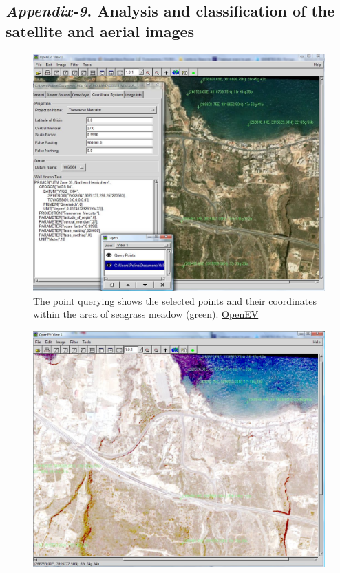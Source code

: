 \documentclass[10pt, a4paper]{article}
\begin{document}
\begin{appendices}
\subsection{\textit{Appendix-9}. Analysis and classification of the satellite and aerial images}

\begin{figure}[H]
	\begin{center}
		\includegraphics[scale=0.23]{OpenEV-2.jpg}
		\caption{The point querying shows the selected points and their coordinates within the area of seagrass meadow (green). \href{http://openev.sourceforge.net/}{OpenEV}}\label{fig:A.39}	
	\end{center}	
\end{figure}
\begin{figure}[H]
	\begin{center}
		\includegraphics[scale=0.23]{OpenEV-3.jpg}

\end{center}
\end{figure}
\end{appendices}
\end{document}
